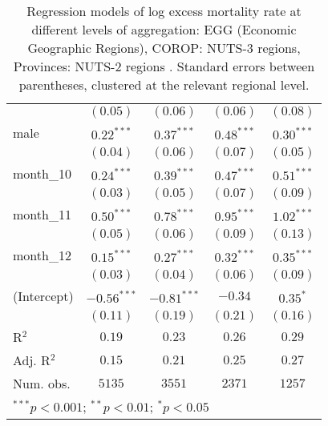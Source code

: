 \begin{table}[h!]
\begin{center}
\begin{small}
\begin{tabular}{l c c c c}
               & $(0.05)$      & $(0.06)$      & $(0.06)$      & $(0.08)$      \\
male           & $0.22^{***}$  & $0.37^{***}$  & $0.48^{***}$  & $0.30^{***}$  \\
               & $(0.04)$      & $(0.06)$      & $(0.07)$      & $(0.05)$      \\
month\_10      & $0.24^{***}$  & $0.39^{***}$  & $0.47^{***}$  & $0.51^{***}$  \\
               & $(0.03)$      & $(0.05)$      & $(0.07)$      & $(0.09)$      \\
month\_11      & $0.50^{***}$  & $0.78^{***}$  & $0.95^{***}$  & $1.02^{***}$  \\
               & $(0.05)$      & $(0.06)$      & $(0.09)$      & $(0.13)$      \\
month\_12      & $0.15^{***}$  & $0.27^{***}$  & $0.32^{***}$  & $0.35^{***}$  \\
               & $(0.03)$      & $(0.04)$      & $(0.06)$      & $(0.09)$      \\
(Intercept)    & $-0.56^{***}$ & $-0.81^{***}$ & $-0.34$       & $0.35^{*}$    \\
               & $(0.11)$      & $(0.19)$      & $(0.21)$      & $(0.16)$      \\
\hline
R$^2$          & $0.19$        & $0.23$        & $0.26$        & $0.29$        \\
Adj. R$^2$     & $0.15$        & $0.21$        & $0.25$        & $0.27$        \\
Num. obs.      & $5135$        & $3551$        & $2371$        & $1257$        \\
\hline
\multicolumn{5}{l}{\tiny{$^{***}p<0.001$; $^{**}p<0.01$; $^{*}p<0.05$}}
\end{tabular}
\end{small}
\caption{Regression models of log excess mortality rate at different levels of aggregation: EGG (Economic Geographic Regions), COROP: NUTS-3 regions, Provinces: NUTS-2 regions . Standard errors between parentheses, clustered at the relevant regional level.}
\label{tab:regionmodels}
\end{center}
\end{table}
